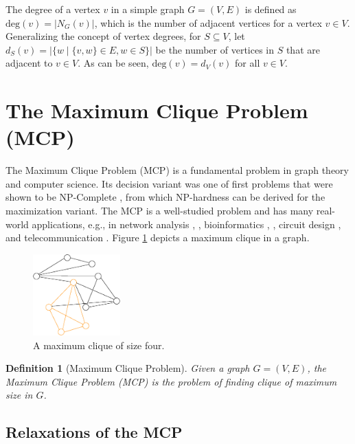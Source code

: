 \documentclass[draft,final]{vutinfth} %
\newtheorem{definition}{Definition}[section]
\begin{document}
The degree of a vertex $v$ in a simple graph $G = (V,E)$ is defined as $\mathrm{deg}(v) = |N_G(v)|$, which is the number of adjacent vertices for a vertex $v \in V$. Generalizing the concept of vertex degrees, for $S \subseteq V$, let $d_S(v) = |\{w \mid \{v,w\} \in E, w \in S\}|$ be the number of vertices in $S$ that are adjacent to $v \in V$. As can be seen, $\mathrm{deg}(v) = d_V(v) $ for all $v \in V$. 


\section{The Maximum Clique Problem (MCP)}\label{sec:mcp}

The Maximum Clique Problem (MCP) is a fundamental problem in graph theory and computer science. Its decision variant was one of first problems that were shown to be NP-Complete \cite{Karp1972}, from which NP-hardness can be derived for the maximization variant. The MCP is a well-studied problem and has many real-world applications, e.g., in network analysis \cite{Fortunato09}, \cite{Palla2005}, bioinformatics \cite{Depolli2013}, \cite{BUTENKO20061}, circuit design \cite{LeckyMA89}, and telecommunication \cite{DouikSAA14}. 
Figure \ref{fig:maxclique} depicts a maximum clique in a graph. 
\begin{figure}
    \centering
    \includegraphics[width=0.3\textwidth]{graphics/graph1-clique.eps}
    \caption{A maximum clique of size four.}
    \label{fig:maxclique}
\end{figure}

\begin{definition}[Maximum Clique Problem]
	\label{def:mcp}
	Given a graph $G = (V,E)$, the Maximum Clique Problem (MCP) is the problem of finding clique of maximum size in $G$. 
\end{definition}

\subsection{Relaxations of the MCP}
\end{document}
